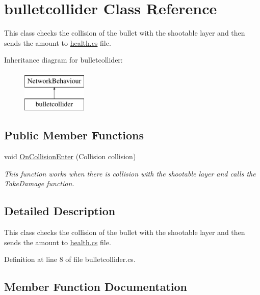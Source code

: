 \hypertarget{classbulletcollider}{}\section{bulletcollider Class Reference}
\label{classbulletcollider}


This class checks the collision of the bullet with the shootable layer and then sends the amount to \mbox{\hyperlink{health_8cs}{health.\+cs}} file.  


Inheritance diagram for bulletcollider\+:\begin{figure}[H]
\begin{center}
\leavevmode
\includegraphics[height=2.000000cm]{classbulletcollider}
\end{center}
\end{figure}
\subsection*{Public Member Functions}
\begin{DoxyCompactItemize}
\item 
void \mbox{\hyperlink{classbulletcollider_ad59d78c182a94a0f9690638eec10479f}{On\+Collision\+Enter}} (Collision collision)
\begin{DoxyCompactList}\small\item\em This function works when there is collision with the shootable layer and calls the Take\+Damage function. \end{DoxyCompactList}\end{DoxyCompactItemize}


\subsection{Detailed Description}
This class checks the collision of the bullet with the shootable layer and then sends the amount to \mbox{\hyperlink{health_8cs}{health.\+cs}} file. 



Definition at line 8 of file bulletcollider.\+cs.



\subsection{Member Function Documentation}
\mbox{\label{classbulletcollider_ad59d78c182a94a0f9690638eec10479f}} 
